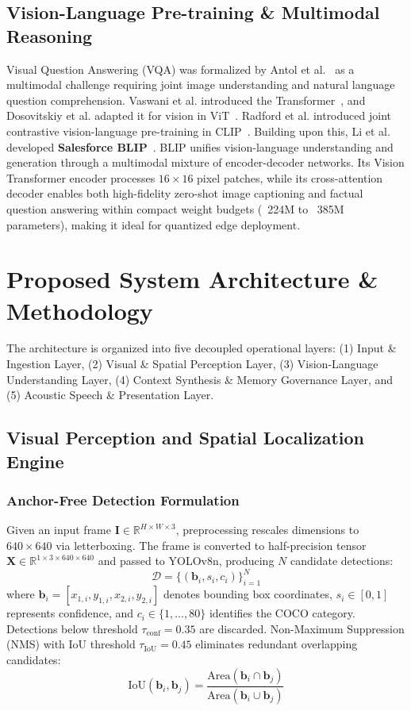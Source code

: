 \documentclass[conference]{IEEEtran}
\begin{document}
\subsection{Vision-Language Pre-training \& Multimodal Reasoning}
Visual Question Answering (VQA) was formalized by Antol et al.~\cite{ref:vqa} as a multimodal challenge requiring joint image understanding and natural language question comprehension. Vaswani et al. introduced the Transformer~\cite{ref:transformer}, and Dosovitskiy et al. adapted it for vision in ViT~\cite{ref:vit}. Radford et al. introduced joint contrastive vision-language pre-training in CLIP~\cite{ref:clip}. Building upon this, Li et al. developed \textbf{Salesforce BLIP}~\cite{ref:blip}. BLIP unifies vision-language understanding and generation through a multimodal mixture of encoder-decoder networks. Its Vision Transformer encoder processes $16 \times 16$ pixel patches, while its cross-attention decoder enables both high-fidelity zero-shot image captioning and factual question answering within compact weight budgets (~224M to ~385M parameters), making it ideal for quantized edge deployment.

\section{Proposed System Architecture \& Methodology}

The architecture is organized into five decoupled operational layers: (1) Input \& Ingestion Layer, (2) Visual \& Spatial Perception Layer, (3) Vision-Language Understanding Layer, (4) Context Synthesis \& Memory Governance Layer, and (5) Acoustic Speech \& Presentation Layer.

\subsection{Visual Perception and Spatial Localization Engine}

\subsubsection{Anchor-Free Detection Formulation}
Given an input frame $\mathbf{I} \in \mathbb{R}^{H \times W \times 3}$, preprocessing rescales dimensions to $640 \times 640$ via letterboxing. The frame is converted to half-precision tensor $\mathbf{X} \in \mathbb{R}^{1 \times 3 \times 640 \times 640}$ and passed to YOLOv8n, producing $N$ candidate detections:
\begin{equation}
\mathcal{D} = \{ (\mathbf{b}_i, s_i, c_i) \}_{i=1}^N
\end{equation}
where $\mathbf{b}_i = [x_{1,i}, y_{1,i}, x_{2,i}, y_{2,i}]$ denotes bounding box coordinates, $s_i \in [0, 1]$ represents confidence, and $c_i \in \{1, \dots, 80\}$ identifies the COCO category. Detections below threshold $\tau_{\text{conf}} = 0.35$ are discarded. Non-Maximum Suppression (NMS) with IoU threshold $\tau_{\text{IoU}} = 0.45$ eliminates redundant overlapping candidates:
\begin{equation}
\text{IoU}(\mathbf{b}_i, \mathbf{b}_j) = \frac{\text{Area}(\mathbf{b}_i \cap \mathbf{b}_j)}{\text{Area}(\mathbf{b}_i \cup \mathbf{b}_j)}
\end{equation}
\end{document}
